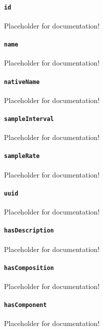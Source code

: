 \paragraph{\texttt{id}}\mbox{}
\newline\tab Placeholder for documentation!

\paragraph{\texttt{name}}\mbox{}
\newline\tab Placeholder for documentation!

\paragraph{\texttt{nativeName}}\mbox{}
\newline\tab Placeholder for documentation!

\paragraph{\texttt{sampleInterval}}\mbox{}
\newline\tab Placeholder for documentation!

\paragraph{\texttt{sampleRate}}\mbox{}
\newline\tab Placeholder for documentation!

\paragraph{\texttt{uuid}}\mbox{}
\newline\tab Placeholder for documentation!

\paragraph{\texttt{hasDescription}}\mbox{}
\newline\tab Placeholder for documentation!

\paragraph{\texttt{hasComposition}}\mbox{}
\newline\tab Placeholder for documentation!

\paragraph{\texttt{hasComponent}}\mbox{}
\newline\tab Placeholder for documentation!

